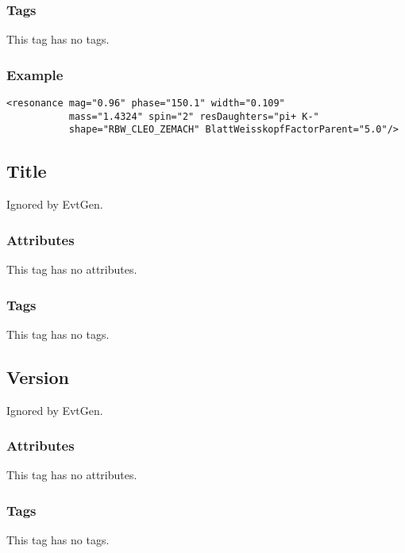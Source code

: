 \subsubsection*{Tags}
This tag has no tags.
\subsubsection*{Example}
{\footnotesize
\begin{verbatim}
<resonance mag="0.96" phase="150.1" width="0.109"
           mass="1.4324" spin="2" resDaughters="pi+ K-"
           shape="RBW_CLEO_ZEMACH" BlattWeisskopfFactorParent="5.0"/>
\end{verbatim}
}

\subsection{Title}
Ignored by EvtGen.
\subsubsection*{Attributes}
This tag has no attributes.
\subsubsection*{Tags}
This tag has no tags.

\subsection{Version}
Ignored by EvtGen.
\subsubsection*{Attributes}
This tag has no attributes.
\subsubsection*{Tags}
This tag has no tags.
